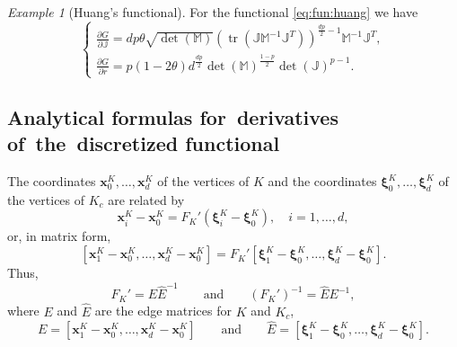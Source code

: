 \documentclass[american]{scrartcl}
\providecommand{\V}[1]{\boldsymbol{#1}}
\providecommand{\p}[2]{\frac{\partial{}#1}{\partial{}#2}}
\providecommand{\M}{\mathbb{M}}
\providecommand{\J}{\mathbb{J}}
\providecommand{\JMJ}{\J \M^{-1}\J^T}
\theoremstyle{remark}
\newtheorem{example}{\hspace{1ex}Example}[section]
\begin{document}
\begin{example}[Huang's functional]
\label{ex:huang:2}
For the functional \cref{eq:fun:huang} we have
\begin{equation}
   \begin{cases}
      \p{G}{\J} =  d p \theta \sqrt{\det(\M)}  {\left( \operatorname{tr}(\JMJ )\right )}^{\frac{d p}{2}-1} \M^{-1} \J^T,
      \\
      \p{G}{r} = p (1-2\theta) d^{\frac{d p}{2}} \det{(\M)}^{\frac{1-p}{2}} \det{(\J)}^{p-1} .
   \end{cases}
   \label{eq:huang:2}
\end{equation}
\end{example}

\subsection{Analytical formulas for~derivatives of~the~discretized functional}

The coordinates $\V{x}_0^K,\dotsc,\V{x}_d^K$ of the vertices of $K$ and the coordinates $\V{\xi}_0^K,\dotsc,\V{\xi}_d^K$ of the vertices of $K_c$ are related by
\[
   \V{x}_i^K - \V{x}_0^K = F_K' (\V{\xi}_i^K -  \V{\xi}_0^K),
   \quad i = 1, \dotsc, d
   ,
\]
or, in matrix form,
\[
   [
   \V{x}_1^K - \V{x}_0^K, \dotsc, \V{x}_d^K - \V{x}_0^K] 
      = F_K' [\V{\xi}_1^K -  \V{\xi}_0^K, \dotsc, \V{\xi}_d^K - \V{\xi}_0^K
   ]
   .
\]
Thus,
\begin{equation}
   F_K' = E \hat{E}^{-1}
   \qquad \text{and} \qquad 
   {(F_K')}^{-1} = \hat{E} E^{-1}
   ,
   \label{eq:FK:1}
\end{equation}
where $E$ and $\hat{E}$ are the edge matrices for $K$ and $K_c$,
\begin{equation}
   E = [\V{x}_1^K - \V{x}_0^K, \dotsc, \V{x}_d^K - \V{x}_0^K]
   \qquad \text{and} \qquad 
   \hat{E} = [\V{\xi}_1^K -  \V{\xi}_0^K, \dotsc, \V{\xi}_d^K -  \V{\xi}_0^K]
   .
   \label{eq:edge:1}
\end{equation}
\end{document}
